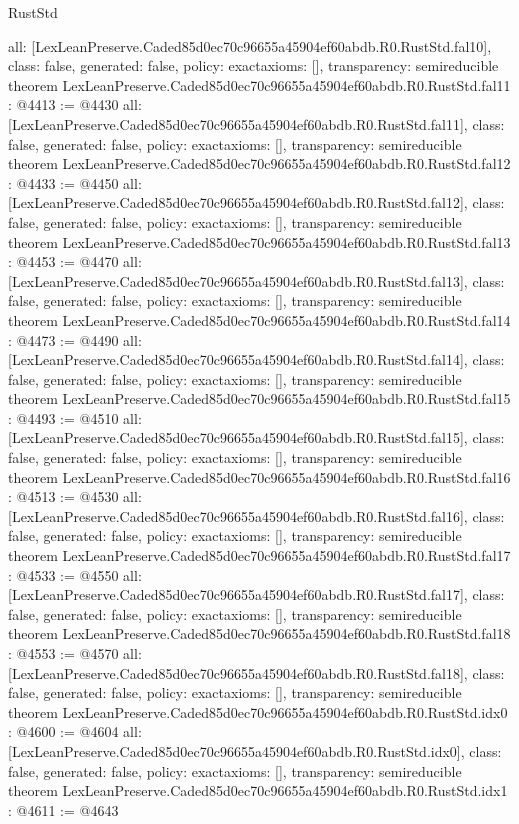 \begin{lexlean}{RustStd}
\begin{coremodule}
{  all: [LexLeanPreserve.Caded85d0ec70c96655a45904ef60abdb.R0.RustStd.fal10],
  class: false,
  generated: false,
  policy: exact{axioms: []},
  transparency: semireducible
}
theorem LexLeanPreserve.Caded85d0ec70c96655a45904ef60abdb.R0.RustStd.fal11 : @4413 := @4430 {
  all: [LexLeanPreserve.Caded85d0ec70c96655a45904ef60abdb.R0.RustStd.fal11],
  class: false,
  generated: false,
  policy: exact{axioms: []},
  transparency: semireducible
}
theorem LexLeanPreserve.Caded85d0ec70c96655a45904ef60abdb.R0.RustStd.fal12 : @4433 := @4450 {
  all: [LexLeanPreserve.Caded85d0ec70c96655a45904ef60abdb.R0.RustStd.fal12],
  class: false,
  generated: false,
  policy: exact{axioms: []},
  transparency: semireducible
}
theorem LexLeanPreserve.Caded85d0ec70c96655a45904ef60abdb.R0.RustStd.fal13 : @4453 := @4470 {
  all: [LexLeanPreserve.Caded85d0ec70c96655a45904ef60abdb.R0.RustStd.fal13],
  class: false,
  generated: false,
  policy: exact{axioms: []},
  transparency: semireducible
}
theorem LexLeanPreserve.Caded85d0ec70c96655a45904ef60abdb.R0.RustStd.fal14 : @4473 := @4490 {
  all: [LexLeanPreserve.Caded85d0ec70c96655a45904ef60abdb.R0.RustStd.fal14],
  class: false,
  generated: false,
  policy: exact{axioms: []},
  transparency: semireducible
}
theorem LexLeanPreserve.Caded85d0ec70c96655a45904ef60abdb.R0.RustStd.fal15 : @4493 := @4510 {
  all: [LexLeanPreserve.Caded85d0ec70c96655a45904ef60abdb.R0.RustStd.fal15],
  class: false,
  generated: false,
  policy: exact{axioms: []},
  transparency: semireducible
}
theorem LexLeanPreserve.Caded85d0ec70c96655a45904ef60abdb.R0.RustStd.fal16 : @4513 := @4530 {
  all: [LexLeanPreserve.Caded85d0ec70c96655a45904ef60abdb.R0.RustStd.fal16],
  class: false,
  generated: false,
  policy: exact{axioms: []},
  transparency: semireducible
}
theorem LexLeanPreserve.Caded85d0ec70c96655a45904ef60abdb.R0.RustStd.fal17 : @4533 := @4550 {
  all: [LexLeanPreserve.Caded85d0ec70c96655a45904ef60abdb.R0.RustStd.fal17],
  class: false,
  generated: false,
  policy: exact{axioms: []},
  transparency: semireducible
}
theorem LexLeanPreserve.Caded85d0ec70c96655a45904ef60abdb.R0.RustStd.fal18 : @4553 := @4570 {
  all: [LexLeanPreserve.Caded85d0ec70c96655a45904ef60abdb.R0.RustStd.fal18],
  class: false,
  generated: false,
  policy: exact{axioms: []},
  transparency: semireducible
}
theorem LexLeanPreserve.Caded85d0ec70c96655a45904ef60abdb.R0.RustStd.idx0 : @4600 := @4604 {
  all: [LexLeanPreserve.Caded85d0ec70c96655a45904ef60abdb.R0.RustStd.idx0],
  class: false,
  generated: false,
  policy: exact{axioms: []},
  transparency: semireducible
}
theorem LexLeanPreserve.Caded85d0ec70c96655a45904ef60abdb.R0.RustStd.idx1 : @4611 := @4643 {
}
\end{coremodule}
\end{lexlean}
